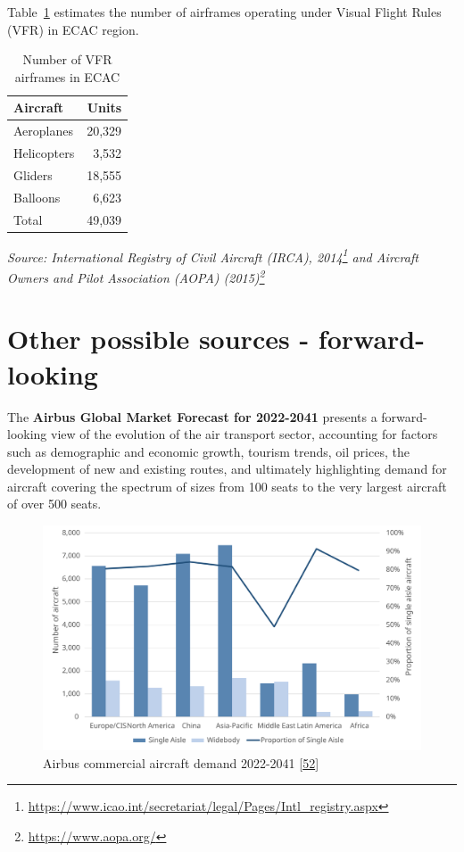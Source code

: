 \documentclass[
  11pt,
  a4paper,
]{book}
\DeclareRobustCommand{\href}[2]{#2\footnote{\url{#1}}}
\begin{document}
Table~\ref{tbl-airframes} estimates the number of airframes operating
under Visual Flight Rules (VFR) in ECAC region.

\hypertarget{tbl-airframes}{}
\setlength{\LTpost}{0mm}
\begin{longtable}{lr}
\caption{\label{tbl-airframes}Number of VFR airframes in ECAC }\tabularnewline

\toprule
Aircraft & Units \\ 
\midrule
Aeroplanes & 20,329 \\ 
Helicopters & 3,532 \\ 
Gliders & 18,555 \\ 
Balloons & 6,623 \\ 
Total & 49,039 \\ 
\bottomrule
\end{longtable}
\begin{minipage}{\linewidth}
\emph{Source: \href{https://www.icao.int/secretariat/legal/Pages/Intl_registry.aspx}{International Registry of Civil Aircraft (IRCA), 2014} and \href{https://www.aopa.org/}{Aircraft Owners and Pilot Association (AOPA) (2015)}}\\
\end{minipage}

\hypertarget{other-possible-sources---forward-looking}{%
\section{Other possible sources -
forward-looking}\label{other-possible-sources---forward-looking}}

The \textbf{Airbus Global Market Forecast for 2022-2041} presents a
forward-looking view of the evolution of the air transport sector,
accounting for factors such as demographic and economic growth, tourism
trends, oil prices, the development of new and existing routes, and
ultimately highlighting demand for aircraft covering the spectrum of
sizes from 100 seats to the very largest aircraft of over 500 seats.

\begin{figure}

{\centering \includegraphics{chapters/../figures/airbus_demand.svg}

}

\caption{\label{fig-airbus-demand}Airbus commercial aircraft demand
2022-2041 \protect\hyperlink{ref-airbusGMF2022}{{[}52{]}}}

\end{figure}
\end{document}
